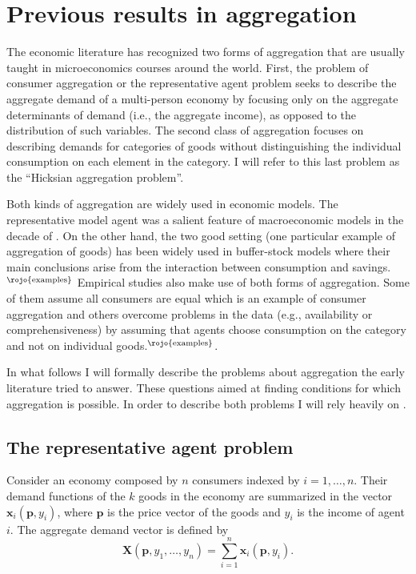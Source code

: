 \documentclass[english, a4paper,12pt]{article}
\begin{document}
\section{Previous results in aggregation} \label{sec:prevresults}
The economic literature has recognized two forms of aggregation that are usually taught in microeconomics courses around the world. First, the problem of consumer aggregation or the representative agent problem seeks to describe the aggregate demand of a multi-person economy by focusing only on the aggregate determinants of demand (i.e., the aggregate income), as opposed to the distribution of such variables. The second class of aggregation focuses on describing demands for categories of goods without distinguishing the individual consumption on each element in the category. I will refer to this last problem as the ``Hicksian aggregation problem''.

Both kinds of aggregation are widely used in economic models. The representative model agent was a salient feature of macroeconomic models in the decade of . On the other hand, the two good setting (one particular example of aggregation of goods) has been widely used in buffer-stock models where their main conclusions arise from the interaction between consumption and savings.$^{\text{\rojo{examples}}}$ Empirical studies also make use of both forms of aggregation. Some of them assume all consumers are equal which is an example of consumer aggregation and others overcome problems in the data (e.g., availability or comprehensiveness) by assuming that agents choose consumption on the category and not on individual goods.$^{\text{\rojo{examples}}}$.

In what follows I will formally describe the problems about aggregation the early literature tried to answer. These questions aimed at finding conditions for which aggregation is possible. In order to describe both problems I will rely heavily on \cite{VarianBook}.

\subsection{The representative agent problem} \label{ssec:repagent}
Consider an economy composed by $n$ consumers indexed by $i = 1, \ldots, n$. Their demand functions of the $k$ goods in the economy are summarized in the vector $\mathbf{x}_{i}(\mathbf{p}, y_{i})$, where $\mathbf{p}$ is the price vector of the goods and $y_{i}$ is the income of agent $i$. The aggregate demand vector is defined by
	\begin{equation} \label{eq:aggdemand1}
		\mathbf{X}(\mathbf{p}, y_{1}, \ldots, y_{n}) = \sum_{i=1}^{n} \mathbf{x}_{i}(\mathbf{p},y_{i}).
	\end{equation}
\end{document}
